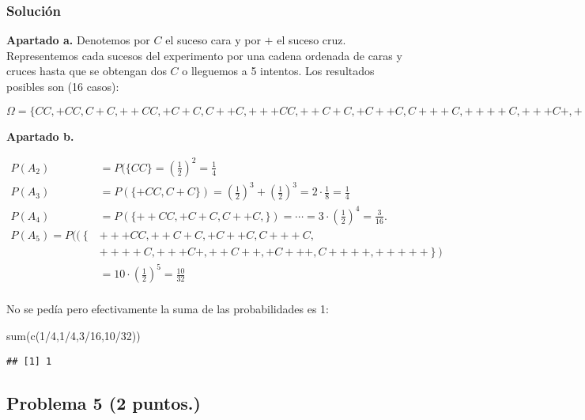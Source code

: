 \documentclass[
]{article}
\newenvironment{Shaded}{\begin{snugshade}}{\end{snugshade}}
\newcommand{\DecValTok}[1]{\textcolor[rgb]{0.00,0.00,0.81}{#1}}
\newcommand{\FunctionTok}[1]{\textcolor[rgb]{0.00,0.00,0.00}{#1}}
\newcommand{\NormalTok}[1]{#1}
\newcommand{\SpecialCharTok}[1]{\textcolor[rgb]{0.00,0.00,0.00}{#1}}
\begin{document}
\hypertarget{soluciuxf3n-3}{%
\subsubsection{Solución}\label{soluciuxf3n-3}}

\textbf{Apartado a.} Denotemos por \(C\) el suceso cara y por \(+\) el
suceso cruz. Representemos cada sucesos del experimento por una cadena
ordenada de caras y cruces hasta que se obtengan dos \(C\) o lleguemos a
5 intentos. Los resultados posibles son (16 casos):

\(\Omega=\{ CC, +CC,C+C, ++CC,+C+C,C++C, +++CC,++C+C,+C++C,C+++C, ++++C,+++C+,++C++,+C+++,C++++ +++++\}\)

\textbf{Apartado b.}

\[
\begin{aligned}
P(A_2) & = P(\{CC\}= \left(\frac{1}{2}\right)^2=\frac{1}{4} \\
P(A_3) & = P(\{+CC,C+C\})=\left(\frac{1}{2}\right)^3+\left(\frac{1}{2}\right)^3=2\cdot \frac{1}{8}=\frac{1}{4} \\
P(A_4) & = P(\{++CC,+C+C,C++C,\})=\cdots=3\cdot \left(\frac{1}{2}\right)^4= \frac{3}{16}. \\
P(A_5) = P(
(
\left\{\right.  & 
+++CC,++C+C,+C++C,C+++C,\\
& \left.  ++++C,+++C+,++C++,+C+++,C++++,
+++++
\right\})\\
  & =  10\cdot \left(\frac{1}{2}\right)^5=\frac{10}{32} \\
\end{aligned}
\]

No se pedía pero efectivamente la suma de las probabilidades es 1:

\begin{Shaded}
\begin{Highlighting}[]
\FunctionTok{sum}\NormalTok{(}\FunctionTok{c}\NormalTok{(}\DecValTok{1}\SpecialCharTok{/}\DecValTok{4}\NormalTok{,}\DecValTok{1}\SpecialCharTok{/}\DecValTok{4}\NormalTok{,}\DecValTok{3}\SpecialCharTok{/}\DecValTok{16}\NormalTok{,}\DecValTok{10}\SpecialCharTok{/}\DecValTok{32}\NormalTok{))}
\end{Highlighting}
\end{Shaded}

\begin{verbatim}
## [1] 1
\end{verbatim}

\hypertarget{problema-5}{%
\subsection{\texorpdfstring{Problema 5
(\textbf{2 puntos.})}{Problema 5 ()}}\label{problema-5}}
\end{document}

